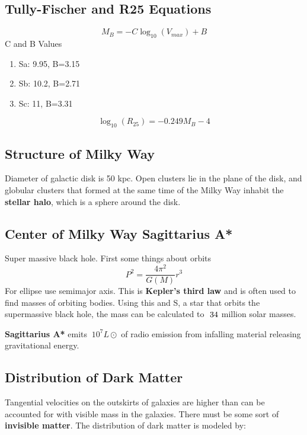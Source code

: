\subsection{Tully-Fischer and R25 Equations}
\begin{equation}
	\label{}
	M_{B}=-C\log_{10}(V_{max})+B
\end{equation}
C and B Values
\begin{enumerate}
	\item Sa: 9.95, B=3.15
\item Sb: 10.2, B=2.71
\item Sc: 11, B=3.31
\end{enumerate}

\begin{equation}
	\label{}
	\log_{10}(R_{25})=-0.249M_{B}-4
\end{equation}


\subsection{Structure of Milky Way}
Diameter of galactic disk is 50 kpc. Open clusters lie in the plane of the disk, and globular clusters that formed at the same time of the Milky Way inhabit the \textbf{stellar halo}, which is a sphere around the disk.


\subsection{Center of Milky Way Sagittarius A*}
Super massive black hole. First some things about orbits
\begin{equation}
	\label{}
	P^{2}=\frac{4\pi^{2}}{G(M)}r^{3}
\end{equation}
For ellipse use semimajor axis. This is \textbf{Kepler's third law} and is often used to find masses of orbiting bodies. Using this and S, a star that orbits the supermassive black hole, the mass can be calculated to $~3\-4$ million solar masses.

\textbf{Sagittarius A*} emits $~10^{7}L\odot$ of radio emission from infalling material releasing gravitational energy.


\subsection{Distribution of Dark Matter}
Tangential velocities on the outskirts of galaxies are higher than can be accounted for with visible mass in the galaxies. There must be some sort of \textbf{invisible matter}. The distribution of dark matter is modeled by:

